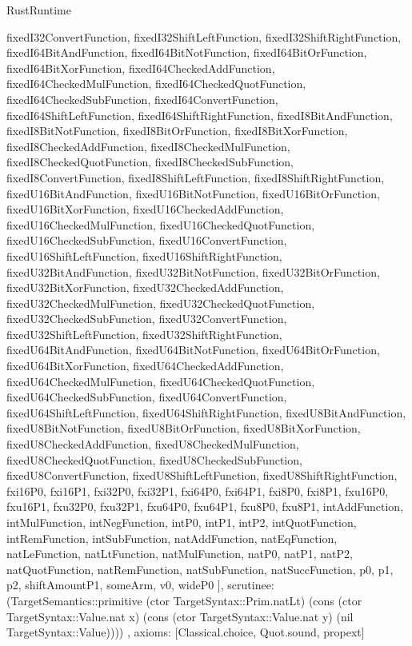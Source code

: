 \begin{lexlean}{RustRuntime}
\begin{semanticmodule}
{{      fixedI32ConvertFunction,
      fixedI32ShiftLeftFunction,
      fixedI32ShiftRightFunction,
      fixedI64BitAndFunction,
      fixedI64BitNotFunction,
      fixedI64BitOrFunction,
      fixedI64BitXorFunction,
      fixedI64CheckedAddFunction,
      fixedI64CheckedMulFunction,
      fixedI64CheckedQuotFunction,
      fixedI64CheckedSubFunction,
      fixedI64ConvertFunction,
      fixedI64ShiftLeftFunction,
      fixedI64ShiftRightFunction,
      fixedI8BitAndFunction,
      fixedI8BitNotFunction,
      fixedI8BitOrFunction,
      fixedI8BitXorFunction,
      fixedI8CheckedAddFunction,
      fixedI8CheckedMulFunction,
      fixedI8CheckedQuotFunction,
      fixedI8CheckedSubFunction,
      fixedI8ConvertFunction,
      fixedI8ShiftLeftFunction,
      fixedI8ShiftRightFunction,
      fixedU16BitAndFunction,
      fixedU16BitNotFunction,
      fixedU16BitOrFunction,
      fixedU16BitXorFunction,
      fixedU16CheckedAddFunction,
      fixedU16CheckedMulFunction,
      fixedU16CheckedQuotFunction,
      fixedU16CheckedSubFunction,
      fixedU16ConvertFunction,
      fixedU16ShiftLeftFunction,
      fixedU16ShiftRightFunction,
      fixedU32BitAndFunction,
      fixedU32BitNotFunction,
      fixedU32BitOrFunction,
      fixedU32BitXorFunction,
      fixedU32CheckedAddFunction,
      fixedU32CheckedMulFunction,
      fixedU32CheckedQuotFunction,
      fixedU32CheckedSubFunction,
      fixedU32ConvertFunction,
      fixedU32ShiftLeftFunction,
      fixedU32ShiftRightFunction,
      fixedU64BitAndFunction,
      fixedU64BitNotFunction,
      fixedU64BitOrFunction,
      fixedU64BitXorFunction,
      fixedU64CheckedAddFunction,
      fixedU64CheckedMulFunction,
      fixedU64CheckedQuotFunction,
      fixedU64CheckedSubFunction,
      fixedU64ConvertFunction,
      fixedU64ShiftLeftFunction,
      fixedU64ShiftRightFunction,
      fixedU8BitAndFunction,
      fixedU8BitNotFunction,
      fixedU8BitOrFunction,
      fixedU8BitXorFunction,
      fixedU8CheckedAddFunction,
      fixedU8CheckedMulFunction,
      fixedU8CheckedQuotFunction,
      fixedU8CheckedSubFunction,
      fixedU8ConvertFunction,
      fixedU8ShiftLeftFunction,
      fixedU8ShiftRightFunction,
      fxi16P0,
      fxi16P1,
      fxi32P0,
      fxi32P1,
      fxi64P0,
      fxi64P1,
      fxi8P0,
      fxi8P1,
      fxu16P0,
      fxu16P1,
      fxu32P0,
      fxu32P1,
      fxu64P0,
      fxu64P1,
      fxu8P0,
      fxu8P1,
      intAddFunction,
      intMulFunction,
      intNegFunction,
      intP0,
      intP1,
      intP2,
      intQuotFunction,
      intRemFunction,
      intSubFunction,
      natAddFunction,
      natEqFunction,
      natLeFunction,
      natLtFunction,
      natMulFunction,
      natP0,
      natP1,
      natP2,
      natQuotFunction,
      natRemFunction,
      natSubFunction,
      natSuccFunction,
      p0,
      p1,
      p2,
      shiftAmountP1,
      someArm,
      v0,
      wideP0
    ],
    scrutinee: (TargetSemantics::primitive (ctor TargetSyntax::Prim.natLt) (cons (ctor TargetSyntax::Value.nat x) (cons (ctor TargetSyntax::Value.nat y) (nil TargetSyntax::Value))))
  },
  axioms: [Classical.choice, Quot.sound, propext]
}


\end{semanticmodule}
\end{lexlean}
